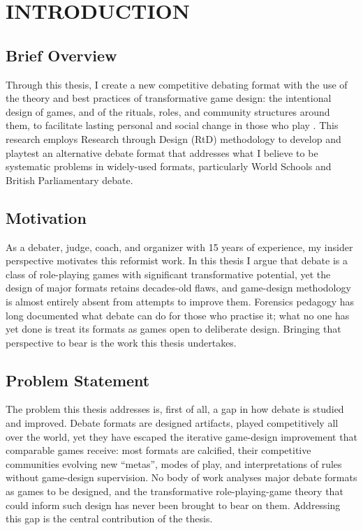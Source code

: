 \section{INTRODUCTION}

\subsection{Brief Overview}

Through this thesis, I create a new competitive debating format with the use of the theory and best practices of transformative game design: the intentional design of games, and of the rituals, roles, and community structures around them, to facilitate lasting personal and social change in those who play \parencite{bowman2025transformative}. This research employs Research through Design (RtD) methodology to develop and playtest an alternative debate format that addresses what I believe to be systematic problems in widely-used formats, particularly World Schools and British Parliamentary debate.

\subsection{Motivation}

As a debater, judge, coach, and organizer with 15 years of experience, my insider perspective motivates this reformist work. In this thesis I argue that debate is a class of role-playing games with significant transformative potential, yet the design of major formats retains decades-old flaws, and game-design methodology is almost entirely absent from attempts to improve them. Forensics pedagogy has long documented what debate can do for those who practise it; what no one has yet done is treat its formats as games open to deliberate design. Bringing that perspective to bear is the work this thesis undertakes.
\subsection{Problem Statement}

The problem this thesis addresses is, first of all, a gap in how debate is studied and improved. Debate formats are designed artifacts, played competitively all over the world, yet they have escaped the iterative game-design improvement that comparable games receive: most formats are calcified, their competitive communities evolving new ``metas'', modes of play, and interpretations of rules without game-design supervision. No body of work analyses major debate formats as games to be designed, and the transformative role-playing-game theory that could inform such design has never been brought to bear on them. Addressing this gap is the central contribution of the thesis.

